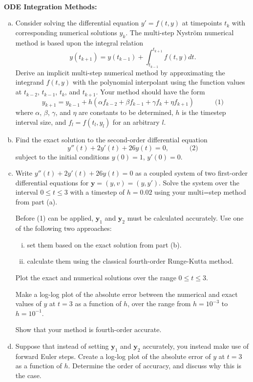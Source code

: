 \documentclass{article}
\renewcommand{\vec}[1]{\mathbf{#1}}
\begin{document}
\begin{problem} \\ 
    \textbf{ODE Integration Methods:} \\
    \begin{enumerate}[(a)]
        \item Consider solving the differential equation $y' = f(t,y)$ at timepoints $t_k$ with corresponding numerical solutions $y_k$. The multi-step Nystr\"om numerical method is based upon the integral relation 
        $$y(t_{k+1}) = y(t_{k-1}) + \int_{t_{k-1}}^{t_{k+1}} f(t,y) dt.$$ 
        Derive an implicit multi-step numerical method by approximating the integrand $f(t,y)$ with the polynomial interpolant using the function values at $t_{k-2}$, $t_{k-1}$, $t_k$, and $t_{k+1}$. Your method should have the form 
        \[y_{k+1} = y_{k-1} + h(\alpha f_{k-2}+\beta f_{k-1} + \gamma f_k+\eta f_{k+1}) \quad \quad \quad \text{(1)}\]
         where $\alpha$, $\beta$, $\gamma$, and $\eta$ are constants to be determined, $h$ is the timestep interval size, and $f_l=f(t_l,y_l)$ for an arbitrary $l$.
        
        \item Find the exact solution to the second-order differential equation 
        \[ y''(t)+2y'(t) + 26y(t)=0, \quad \quad \quad \text{(2)}\]
        subject to the initial conditions $y(0)=1$, $y'(0)=0$.
        
        \item Write $y''(t)+2y'(t) + 26y(t)=0$ as a coupled system of two first-order differential equations for $\vec{y} = (y,v) = (y,y')$. Solve the system over the interval $0 \leq t \leq 3$ with a timestep of $h = 0.02$ using your multi=step method from part (a).

        Before (1) can be applied, $\vec{y}_1$ and $\vec{y}_2$ must be calculated accurately. Use one of the following two approaches:
        \begin{enumerate}[i.)]
            \item set them based on the exact solution from part (b).
            \item calculate them using the classical fourth-order Runge-Kutta method.
        \end{enumerate}
        Plot the exact and numerical solutions over the range $0 \leq t \leq 3$.

        Make a log-log plot of the absolute error between the numerical and exact values of $y$ at $t = 3$ as a function of $h$, over the range from $h = 10^{-3}$ to $h = 10^{-1}$.

        Show that your method is fourth-order accurate.
        
        \item Suppose that instead of setting $\vec{y}_1$ and $\vec{y}_2$ accurately, you instead make use of forward Euler steps. Create a log-log plot of the absolute error of $y$ at $t=3$ as a function of $h$. Determine the order of accuracy, and discuss why this is the case.
    \end{enumerate}
\end{problem}
\end{document}
